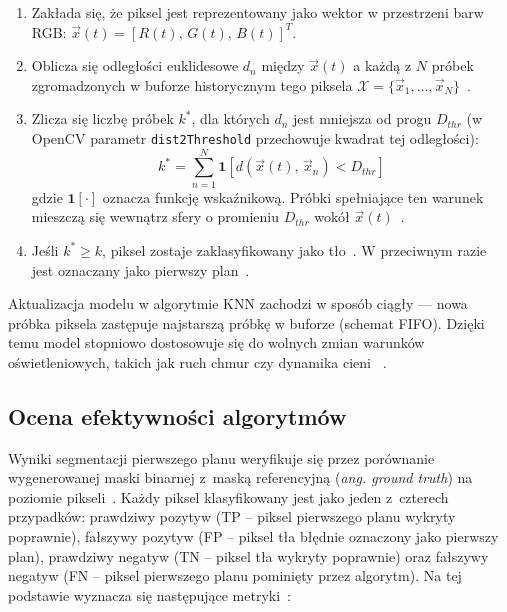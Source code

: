 \begin{enumerate}
  \item Zakłada się, że piksel jest reprezentowany jako wektor w przestrzeni barw RGB: $\vec{x}(t) =
          [R(t),\, G(t),\, B(t)]^T$.

  \item Oblicza się odległości euklidesowe $d_n$ między $\vec{x}(t)$ a każdą z $N$ próbek zgromadzonych w
        buforze historycznym tego piksela $\mathcal{X} = \{\vec{x}_1, \dots,
          \vec{x}_N\}$~\cite{zivkovic2006, cucchiara2003}.

  \item Zlicza się liczbę próbek $k^*$, dla których $d_n$ jest mniejsza od progu $D_{thr}$ (w OpenCV
        parametr \texttt{dist2Threshold} przechowuje kwadrat tej odległości):
        \begin{equation}
          k^* = \sum_{n=1}^{N} \mathbf{1}\!\left[d\!\left(\vec{x}(t),\,\vec{x}_n\right) < D_{thr}\right]
        \end{equation}
        gdzie $\mathbf{1}[\cdot]$ oznacza funkcję wskaźnikową. Próbki spełniające ten warunek
        mieszczą się wewnątrz sfery o promieniu $D_{thr}$ wokół $\vec{x}(t)$~\cite{prati2003,
          zivkovic2006, opencv2025}.

  \item Jeśli $k^* \ge k$, piksel zostaje zaklasyfikowany jako tło~\cite{zivkovic2006, opencv2025}. W
        przeciwnym razie jest oznaczany jako pierwszy plan~\cite{zivkovic2006, opencv2025}.
\end{enumerate}

Aktualizacja modelu w algorytmie KNN zachodzi w sposób ciągły — nowa próbka piksela zastępuje
najstarszą próbkę w buforze (schemat FIFO). Dzięki temu model stopniowo dostosowuje się do wolnych
zmian warunków oświetleniowych, takich jak ruch chmur czy dynamika cieni~\cite{zivkovic2006} .

\subsection{Ocena efektywności algorytmów}

Wyniki segmentacji pierwszego planu weryfikuje się przez porównanie wygenerowanej maski binarnej
z~maską referencyjną (\textit{ang. ground truth}) na poziomie pikseli~\cite{cdnet2014}. Każdy
piksel klasyfikowany jest jako jeden z~czterech przypadków: prawdziwy pozytyw (TP -- piksel
pierwszego planu wykryty poprawnie), fałszywy pozytyw (FP -- piksel tła błędnie oznaczony jako
pierwszy plan), prawdziwy negatyw (TN -- piksel tła wykryty poprawnie) oraz fałszywy negatyw (FN --
piksel pierwszego planu pominięty przez algorytm). Na tej podstawie wyznacza się następujące
metryki~\cite{cdnet2014}:

